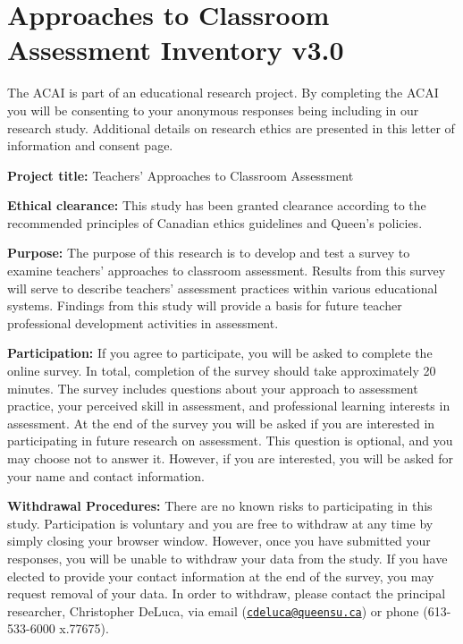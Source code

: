 \documentclass[
]{book}
\begin{document}
\hypertarget{approaches-to-classroom-assessment-inventory-v3.0}{%
\chapter{Approaches to Classroom Assessment Inventory v3.0}\label{approaches-to-classroom-assessment-inventory-v3.0}}

The ACAI is part of an educational research project. By completing the ACAI you will be consenting to your anonymous responses being including in our research study. Additional details on research ethics are presented in this letter of information and consent page.

\textbf{Project title:} Teachers' Approaches to Classroom Assessment

\textbf{Ethical clearance:} This study has been granted clearance according to the recommended principles of Canadian ethics guidelines and Queen's policies.

\textbf{Purpose:} The purpose of this research is to develop and test a survey to examine teachers' approaches to classroom assessment. Results from this survey will serve to describe teachers' assessment practices within various educational systems. Findings from this study will provide a basis for future teacher professional development activities in assessment.

\textbf{Participation:} If you agree to participate, you will be asked to complete the online survey. In total, completion of the survey should take approximately 20 minutes. The survey includes questions about your approach to assessment practice, your perceived skill in assessment, and professional learning interests in assessment. At the end of the survey you will be asked if you are interested in participating in future research on assessment. This question is optional, and you may choose not to answer it. However, if you are interested, you will be asked for your name and contact information.

\textbf{Withdrawal Procedures:} There are no known risks to participating in this study. Participation is voluntary and you are free to withdraw at any time by simply closing your browser window. However, once you have submitted your responses, you will be unable to withdraw your data from the study. If you have elected to provide your contact information at the end of the survey, you may request removal of your data. In order to withdraw, please contact the principal researcher, Christopher DeLuca, via email (\href{mailto:cdeluca@queensu.ca}{\nolinkurl{cdeluca@queensu.ca}}) or phone (613-533-6000 x.77675).
\end{document}
